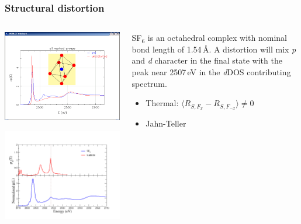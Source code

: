 \begin{frame}
  \frametitle{Structural distortion}
  \begin{columns}
    \begin{column}{5cm}
      \centering\includegraphics[width=0.9\linewidth]{images/SF6/sf6_undistorted}

      \centering\includegraphics[width=0.9\linewidth]{images/SF6/ddos}
    \end{column}
    \begin{column}{6cm}
      SF$_6$ is an octahedral complex with nominal bond length of
      1.54\,\AA.  A distortion will mix \textit{p} and \textit{d}
      character in the final state with the peak near 2507\,eV in the
      \textit{d}DOS contributing spectrum.
      \begin{itemize}
      \item Thermal: $\langle R_{S,F_x} - R_{S,F_{-x}}\rangle \ne 0$
      \item Jahn-Teller
      \end{itemize}


\end{column}
\end{columns}
\end{frame}
